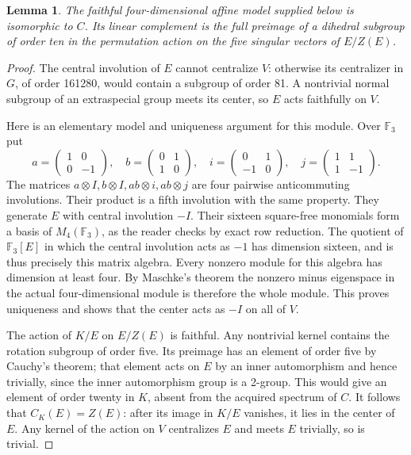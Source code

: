\documentclass[11pt,a4paper]{article}
\newtheorem{lemma}{Lemma}\newtheorem{theorem}{Theorem}
\begin{document}
\begin{lemma}\label{Cmodel}
The faithful four-dimensional affine model supplied below is
isomorphic to $C$. Its linear complement is the full preimage of
a dihedral subgroup of order ten in the permutation action on the
five singular vectors of $E/Z(E)$.
\end{lemma}
\begin{proof}
The central involution of $E$ cannot centralize $V$: otherwise its
centralizer in $G$, of order 161280, would contain a subgroup of
order 81. A nontrivial normal subgroup of an extraspecial group
meets its center, so $E$ acts faithfully on $V$.

Here is an elementary model and uniqueness argument for this module.
Over $\mathbb F_3$ put
\[
 a=\begin{pmatrix}1&0\\0&-1\end{pmatrix},\quad
 b=\begin{pmatrix}0&1\\1&0\end{pmatrix},\quad
 i=\begin{pmatrix}0&1\\-1&0\end{pmatrix},\quad
 j=\begin{pmatrix}1&1\\1&-1\end{pmatrix}.
\]
The matrices $a\otimes I,b\otimes I,ab\otimes i,ab\otimes j$
are four pairwise anticommuting involutions. Their product is a
fifth involution with the same property. They generate $E$ with
central involution $-I$. Their sixteen square-free monomials form
a basis of $M_4(\mathbb F_3)$, as the reader checks by exact row
reduction. The quotient of $\mathbb F_3[E]$ in which the central
involution acts as $-1$ has dimension sixteen, and is thus precisely
this matrix algebra. Every nonzero module for this algebra has
dimension at least four. By Maschke's theorem the nonzero minus
eigenspace in the actual four-dimensional module is therefore
the whole module. This proves uniqueness and shows that the center
acts as $-I$ on all of $V$.

The action of $K/E$ on $E/Z(E)$ is faithful. Any nontrivial kernel
contains the rotation subgroup of order five. Its preimage has an
element of order five by Cauchy's theorem; that element acts on $E$
by an inner automorphism and hence trivially, since the inner
automorphism group is a 2-group. This would give an element of order
twenty in $K$, absent from the acquired spectrum of $C$.
It follows that $C_K(E)=Z(E)$: after its image in $K/E$ vanishes,
it lies in the center of $E$. Any kernel of the action on $V$
centralizes $E$ and meets $E$ trivially, so is trivial.


\end{proof}
\end{document}

